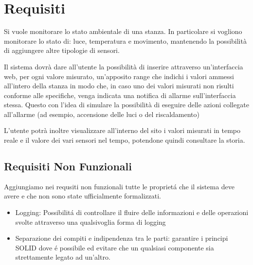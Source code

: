 \section{Requisiti}

Si vuole monitorare lo stato ambientale di una stanza. In particolare si vogliono monitorare lo stato di: luce, temperatura e movimento, mantenendo la possibilità di aggiungere altre tipologie di sensori.

Il sistema dovrà dare all'utente la possibilità di inserire attraverso un'interfaccia web, per ogni valore misurato, un'apposito range che indichi i valori ammessi all'intero della stanza in modo che, in caso uno dei valori misurati non risulti conforme alle specifiche, venga indicata una notifica di allarme sull'interfaccia stessa. Questo con l'idea di simulare la possibilità di eseguire delle azioni collegate all'allarme (ad esempio, accensione delle luci o del riscaldamento)

L'utente potrà inoltre visualizzare all'interno del sito i valori misurati in tempo reale e il valore dei vari sensori nel tempo, potendone quindi consultare la storia.

\subsection{Requisiti Non Funzionali}

Aggiungiamo nei requsiti non funzionali tutte le propriet\'a che il sistema deve avere e che non sono state ufficialmente formalizzati.

\begin{itemize}
  \item Logging: Possibilit\'a di controllare il fluire delle informazioni e delle operazioni svolte attraverso una qualsivoglia forma di logging
  \item Separazione dei compiti e indipendenza tra le parti: garantire i principi SOLID dove \'e possibile ed evitare che un qualsiasi componente sia strettamente legato ad un'altro.
\end{itemize}
